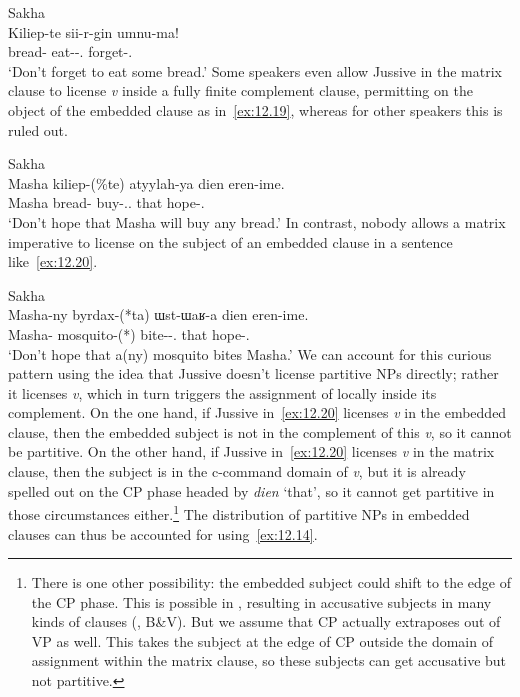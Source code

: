 \documentclass[output=paper]{langsci/langscibook}
\begin{document}
\ea\label{ex:12.18}Sakha\\
	\gll Kiliep-te  sii-r-gin  umnu-ma!\\
		bread-\Part{}  eat-\Aor{}-\Ssg{}.\Acc{}  forget-\Neg{}.\Imp{}\\
	\glt ‘Don’t forget to eat some bread.’
\z
Some speakers even allow Jussive in the matrix clause to license \emph{v}\textsubscript{\Imp} inside a fully finite complement clause, permitting  on the object of the embedded clause as in~\eqref{ex:12.19}, whereas for other speakers this is ruled out.

\ea\label{ex:12.19}Sakha\\
	\gll Masha  kiliep-(\%te) atyylah-ya dien eren-ime.\\
		Masha  bread-\Part{}  buy-\Fut{}.\Tsg.\Sbj{}  that  hope-\Neg{}.\Imp{}\\
	\glt ‘Don’t hope that Masha will buy any bread.’
\z
In contrast, nobody allows a matrix imperative to license
 on the subject of an embedded clause in a sentence
like~\eqref{ex:12.20}.

\ea\label{ex:12.20}Sakha\\
	\gll Masha-ny   byrdax-(*ta)         ɯst-ɯaʁ-a    dien  eren-ime.\\
		Masha-\Acc{}  mosquito-(*\Part{})  bite-\Fut{}-\Tsg.\Sbj{}  that    hope-\Neg{}.\Imp{}\\
	\glt ‘Don’t hope that a(ny) mosquito bites Masha.’
\z
We can account for this curious pattern using the idea that Jussive doesn’t
license partitive NPs directly; rather it licenses
\emph{v}\textsubscript{\Imp}, which in turn triggers the assignment of
 locally inside its complement. On the one hand, if Jussive
in~\eqref{ex:12.20} licenses \emph{v}\textsubscript{\Imp} in the embedded
clause, then the embedded subject is not in the complement of this
\emph{v}\textsubscript{\Imp}, so it cannot be partitive. On the other hand, if
Jussive in~\eqref{ex:12.20} licenses \emph{v}\textsubscript{\Imp} in the
matrix clause, then the subject is in the c-command domain of
\emph{v}\textsubscript{\Imp}, but it is already spelled out on the CP
phase headed by \emph{dien} ‘that’, so it cannot get partitive in
those circumstances either.\footnote{There is one other possibility: the
    embedded subject could shift to the edge of the CP phase. This
    is possible in , resulting in accusative subjects in many kinds
    of clauses (\citealt{Vinokurova2005}, B\&V). But we assume that CP actually
    extraposes out of VP as well.  This takes the subject at the edge of CP
outside the domain of  assignment within the matrix clause,
so these subjects can get accusative but not partitive.\label{fn:12.8}}  The
distribution of partitive NPs in embedded clauses can thus be accounted for
using~\eqref{ex:12.14}.
\end{document}
